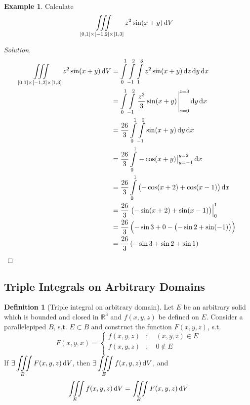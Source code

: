 \documentclass[fleqn, a4paper, 12pt]{article}
\theoremstyle{definition}
\newtheorem{example}{Example}
\newtheorem{definition}{Definition}
\theoremstyle{theorem}
\theoremstyle{remark}
\newenvironment{solution}
{\begin{proof}[Solution]\let\qed\relax}
	{\end{proof}}
\begin{document}
\begin{example}
	Calculate \[\iiint\limits_{[0,1] \times [-1,2] \times [1,3]} z^2 \sin (x + y) \dif V\]
\end{example}

\begin{solution}
	\begin{align*}
		\iiint\limits_{[0,1] \times [-1,2] \times [1,3]} z^2 \sin (x + y) \dif V &= \int\limits_{0}^{1} \int\limits_{-1}^{2} \int\limits_{1}^{3} z^2 \sin (x + y) \dif z \dif y \dif x\\
		&= \int\limits_{0}^{1} \int\limits_{-1}^{2} \left. \dfrac{z^3}{3} \sin (x + y) \right\rvert_{z = 0}^{z = 3} \dif y \dif x\\
		&= \dfrac{26}{3} \int\limits_{0}^{1} \int\limits_{-1}^{2} \sin (x + y) \dif y \dif x\\
		&= \dfrac{26}{3} \int\limits_{0}^{1} \left. -\cos (x + y) \right\rvert_{y = -1}^{y = 2} \dif x\\
		&= \dfrac{26}{3} \int\limits_{0}^{1} \left( -\cos (x + 2) + \cos (x - 1) \right) \dif x\\
		&= \dfrac{26}{3} \left. \left( -\sin (x + 2) + \sin (x - 1) \right) \right\rvert_{0}^{1}\\
		&= \dfrac{26}{3} \left( -\sin 3 + 0 - \left( -\sin 2 + \sin (-1) \right) \right)\\
		&= \dfrac{26}{3} \left( -\sin 3 + \sin 2 + \sin 1 \right)
	\end{align*}
\end{solution}

\subsection{Triple Integrals on Arbitrary Domains}

\begin{definition}[Triple integral on arbitrary domain]
	Let $E$ be an arbitrary solid which is bounded and closed in $\mathbb{R}^3$ and $f(x,y,z)$ be defined on $E$. Consider a parallelepiped $B$, s.t. $E \subset B$ and construct the function $F(x,y,z)$, s.t.
	\begin{equation*}
		F(x,y,x) = 
			\begin{cases}
				f(x,y,z) &;\quad (x,y,z) \in E\\
				f(x,y,z) &;\quad 0 \notin E\\
			\end{cases}
	\end{equation*}
	If $\displaystyle \exists \iiint\limits_{B} F(x,y,z) \dif V$, then $\displaystyle \exists \iiint\limits_{E} f(x,y,z) \dif V$, and
	\begin{equation*}
	\iiint\limits_{E} f(x,y,z) \dif V = \iiint\limits_{B} F(x,y,z) \dif V
	\end{equation*}
\end{definition}
\end{document}
